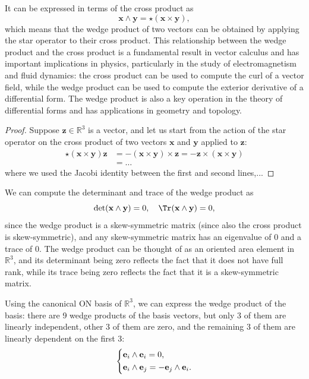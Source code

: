 It can be expressed in terms of the cross product as
\[
    \mathbf{x} \wedge \mathbf{y} = \star (\mathbf{x} \times \mathbf{y}),
\]
which means that the wedge product of two vectors can be obtained by applying the star operator to their cross product. This relationship between the wedge product and the cross product is a fundamental result in vector calculus and has important implications in physics, particularly in the study of electromagnetism and fluid dynamics: the cross product can be used to compute the curl of a vector field, while the wedge product can be used to compute the exterior derivative of a differential form. The wedge product is also a key operation in the theory of differential forms and has applications in geometry and topology.
\begin{proof}
    Suppose \(\mathbf{z} \in \mathbb{R}^3\) is a vector, and let us start from the action of the star operator on the cross product of two vectors \(\mathbf{x}\) and \(\mathbf{y}\) applied to \(\mathbf{z}\):
    \[
        \begin{aligned}
            \star (\mathbf{x} \times \mathbf{y}) \mathbf{z} & = - (\mathbf{x} \times \mathbf{y}) \times \mathbf{z}
            = - \mathbf{z} \times (\mathbf{x} \times \mathbf{y})                                                   \\
                                                            & = \dots
        \end{aligned}
    \]
    where we used the Jacobi identity between the first and second lines,...
\end{proof}

We can compute the determinant and trace of the wedge product as
\[
    \det(\mathbf{x} \wedge \mathbf{y}) = 0, \quad \Tr(\mathbf{x} \wedge \mathbf{y}) = 0,
\]
since the wedge product is a skew-symmetric matrix (since also the cross product is skew-symmetric), and any skew-symmetric matrix has an eigenvalue of 0 and a trace of 0. The wedge product can be thought of as an oriented area element in \(\mathbb{R}^3\), and its determinant being zero reflects the fact that it does not have full rank, while its trace being zero reflects the fact that it is a skew-symmetric matrix.

Using the canonical ON basis of \(\mathbb{R}^3\), we can express the wedge product of the basis: there are 9 wedge products of the basis vectors, but only 3 of them are linearly independent, other 3 of them are zero, and the remaining 3 of them are linearly dependent on the first 3:
\[
    \begin{aligned}
        \begin{dcases}
            \mathbf{e}_i \wedge \mathbf{e}_i = 0, \\
            \mathbf{e}_i \wedge \mathbf{e}_j = - \mathbf{e}_j \wedge \mathbf{e}_i.
        \end{dcases}
    \end{aligned}
\]

